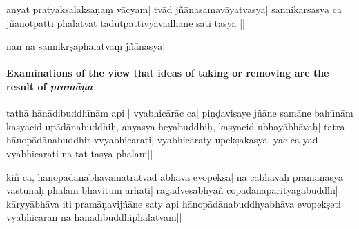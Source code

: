  anyat pratyakṣalakṣaṇaṃ vācyam| tvād  jñānasamavāyatvasya| sannikarṣasya ca jñānotpatti%
phalatvāt tadu\-tpattivyavadhāne sati tasya  ||

%
nan
na sannikrṣaphalatvaṃ jñānasya| %
%

\paragraph{Examinations of the view that ideas of taking or removing are the result of \emph{pramāṇa}}
tathā hānādibuddhīnām api |
%
vyabhicārāc ca| 
%
piṇḍaviṣaye jñāne samāne bahūnām 
kasyacid upādānabuddhiḥ, anyasya heyabuddhiḥ, kasyacid ubhayābh\mms āvaḥ\mme | tatra hānopādānabuddhir vvyabhicarati|
vyabhicaraty upekṣakasya| yac ca yad vyabhicarati na tat tasya phalam||
%

kiñ ca, hānopādānābhāvamātratvād abhāva evopekṣā| na cābhāvaḥ \mms pramā\-ṇa\-sya va\mme stunaḥ \mms %
phalam \mme bhavitum arhati| rāgadveṣābhyāñ copādānaparityāga\-bu\-ddhī|
kāryyābhāva iti pramāṇavijñāne saty %
api hā\-no\-pādānabuddhyabhāva evopekṣeti
vyabhicārān na hānādibu\mms ddhiphalatvam||
%

